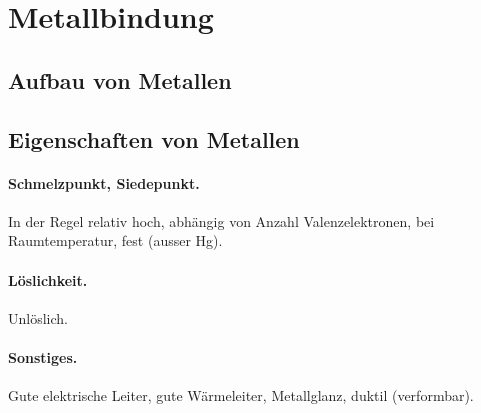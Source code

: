 \section{Metallbindung}

\subsection{Aufbau von Metallen}

\subsection{Eigenschaften von Metallen}

\paragraph{Schmelzpunkt, Siedepunkt.}

In der Regel relativ hoch, abhängig von Anzahl Valenzelektronen, bei Raumtemperatur, fest (ausser Hg).

\paragraph{Löslichkeit.}

Unlöslich.

\paragraph{Sonstiges.}

Gute elektrische Leiter, gute Wärmeleiter, Metallglanz, duktil (verformbar).